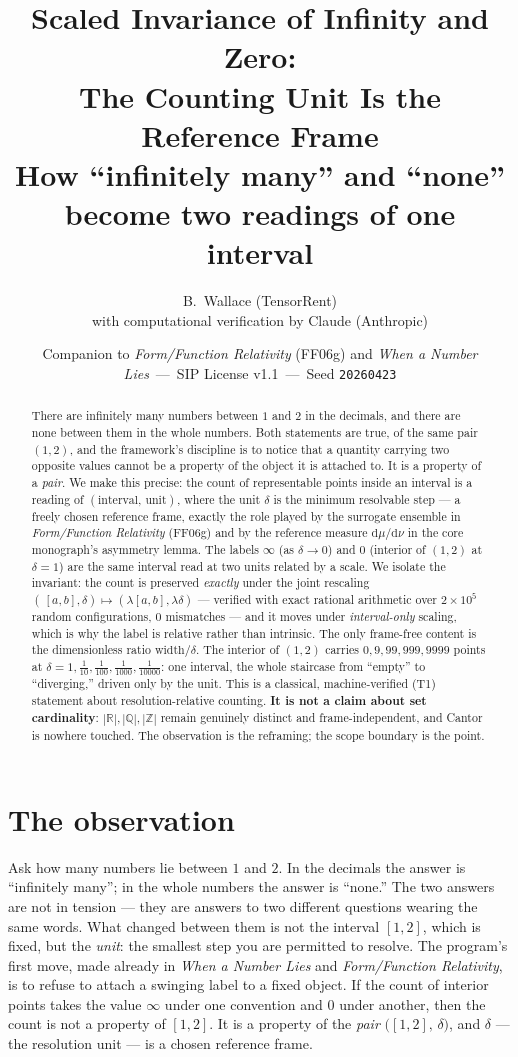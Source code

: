 \documentclass[11pt]{article}
\title{\textbf{Scaled Invariance of Infinity and Zero:\\
The Counting Unit Is the Reference Frame}\\[4pt]
\large How ``infinitely many'' and ``none'' become two readings of one interval}
\author{B.\ Wallace \quad (TensorRent)\\
\small with computational verification by Claude (Anthropic)}
\date{\small Companion to \textit{Form/Function Relativity} (FF06g) and \textit{When a Number Lies}\ ---\ SIP License v1.1\ ---\ Seed \texttt{20260423}}
\theoremstyle{definition}
\theoremstyle{plain}
\newcommand{\Z}{\mathbb{Z}}
\newcommand{\R}{\mathbb{R}}
\newcommand{\Q}{\mathbb{Q}}
\begin{document}
\maketitle

\begin{abstract}
There are infinitely many numbers between $1$ and $2$ in the decimals, and there are none
between them in the whole numbers. Both statements are true, of the same pair $(1,2)$, and the
framework's discipline is to notice that a quantity carrying two opposite values cannot be a
property of the object it is attached to. It is a property of a \emph{pair}. We make this precise:
the count of representable points inside an interval is a reading of $(\text{interval},\,\text{unit})$,
where the unit $\delta$ is the minimum resolvable step --- a freely chosen reference frame, exactly
the role played by the surrogate ensemble in \textit{Form/Function Relativity} (FF06g) and by the
reference measure $\mathrm{d}\mu/\mathrm{d}\nu$ in the core monograph's asymmetry lemma. The labels
$\infty$ (as $\delta\to 0$) and $0$ (interior of $(1,2)$ at $\delta=1$) are the same interval read at
two units related by a scale. We isolate the invariant: the count is preserved \emph{exactly} under
the joint rescaling $(\,[a,b],\delta)\mapsto(\lambda[a,b],\lambda\delta)$ --- verified with exact
rational arithmetic over $2\times10^{5}$ random configurations, $0$ mismatches --- and it moves under
\emph{interval-only} scaling, which is why the label is relative rather than intrinsic. The only
frame-free content is the dimensionless ratio $\mathrm{width}/\delta$. The interior of $(1,2)$ carries
$0,9,99,999,9999$ points at $\delta = 1,\tfrac1{10},\tfrac1{100},\tfrac1{1000},\tfrac1{10000}$: one
interval, the whole staircase from ``empty'' to ``diverging,'' driven only by the unit. This is a
classical, machine-verified (T1) statement about resolution-relative counting. \textbf{It is not a
claim about set cardinality}: $|\R|,|\Q|,|\Z|$ remain genuinely distinct and frame-independent, and
Cantor is nowhere touched. The observation is the reframing; the scope boundary is the point.
\end{abstract}

\section{The observation}\label{sec:obs}

Ask how many numbers lie between $1$ and $2$. In the decimals the answer is ``infinitely many'';
in the whole numbers the answer is ``none.'' The two answers are not in tension --- they are answers
to two different questions wearing the same words. What changed between them is not the interval
$[1,2]$, which is fixed, but the \emph{unit}: the smallest step you are permitted to resolve. The
program's first move, made already in \textit{When a Number Lies} and \textit{Form/Function
Relativity}, is to refuse to attach a swinging label to a fixed object. If the count of interior
points takes the value $\infty$ under one convention and $0$ under another, then the count is not a
property of $[1,2]$. It is a property of the \emph{pair} $\big([1,2],\,\delta\big)$, and $\delta$ ---
the resolution unit --- is a chosen reference frame.
\end{document}
